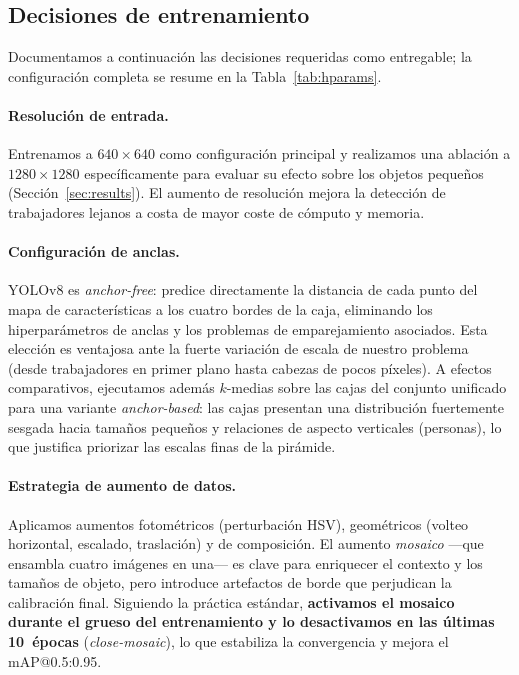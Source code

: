 \documentclass{article}
\begin{document}
\subsection{Decisiones de entrenamiento}
\label{sec:training}
Documentamos a continuación las decisiones requeridas como entregable; la
configuración completa se resume en la Tabla~\ref{tab:hparams}.

\paragraph{Resolución de entrada.} Entrenamos a $640\times640$ como
configuración principal y realizamos una ablación a $1280\times1280$
específicamente para evaluar su efecto sobre los objetos pequeños
(Sección~\ref{sec:results}). El aumento de resolución mejora la detección de
trabajadores lejanos a costa de mayor coste de cómputo y memoria.

\paragraph{Configuración de anclas.} YOLOv8 es \emph{anchor-free}: predice
directamente la distancia de cada punto del mapa de características a los cuatro
bordes de la caja, eliminando los hiperparámetros de anclas y los problemas de
emparejamiento asociados. Esta elección es ventajosa ante la fuerte variación
de escala de nuestro problema (desde trabajadores en primer plano hasta cabezas
de pocos píxeles). A efectos comparativos, ejecutamos además
$k$-medias sobre las cajas del conjunto unificado para una variante
\emph{anchor-based}: las cajas presentan una distribución fuertemente sesgada
hacia tamaños pequeños y relaciones de aspecto verticales (personas), lo que
justifica priorizar las escalas finas de la pirámide.

\paragraph{Estrategia de aumento de datos.} Aplicamos aumentos fotométricos
(perturbación HSV), geométricos (volteo horizontal, escalado, traslación) y de
composición. El aumento \emph{mosaico} —que ensambla cuatro imágenes en una—
es clave para enriquecer el contexto y los tamaños de objeto, pero introduce
artefactos de borde que perjudican la calibración final. Siguiendo la práctica
estándar, \textbf{activamos el mosaico durante el grueso del entrenamiento y lo
desactivamos en las últimas 10~épocas} (\emph{close-mosaic}), lo que estabiliza
la convergencia y mejora el mAP@0.5:0.95.
\end{document}
